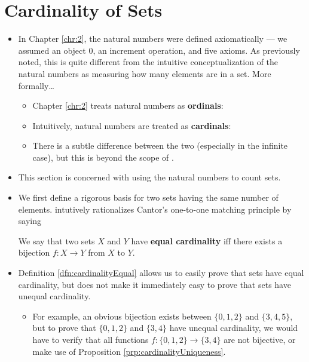 \documentclass[../main.tex]{subfiles}
\begin{document}
\section{Cardinality of Sets}
\begin{itemize}
    \item {}In Chapter \ref{chr:2}, the natural numbers were defined axiomatically --- we assumed an object 0, an increment operation, and five axioms. As previously noted, this is quite different from the intuitive conceptualization of the natural numbers as measuring how many elements are in a set. More formally\dots
    \begin{itemize}
        \item Chapter \ref{chr:2} treats natural numbers as \textbf{ordinals}: 
        \item Intuitively, natural numbers are treated as \textbf{cardinals}: 
        \item There is a subtle difference between the two (especially in the infinite case), but this is beyond the scope of \cite{bib:AnalysisI}.
    \end{itemize}
    \item This section is concerned with using the natural numbers to count sets.
    \item {}We first define a rigorous basis for two sets having the same number of elements. \cite{bib:AnalysisI} intutively rationalizes Cantor's one-to-one matching principle by saying 
    \begin{dfn}\label{dfn:cardinalityEqual}
        We say that two sets $X$ and $Y$ have \textbf{equal cardinality} iff there exists a bijection $f:X\to Y$ from $X$ to $Y$.
    \end{dfn}
    \item Definition \ref{dfn:cardinalityEqual} allows us to easily prove that sets have equal cardinality, but does not make it immediately easy to prove that sets have unequal cardinality.
    \begin{itemize}
        \item For example, an obvious bijection exists between $\{0,1,2\}$ and $\{3,4,5\}$, but to prove that $\{0,1,2\}$ and $\{3,4\}$ have unequal cardinality, we would have to verify that all functions $f:\{0,1,2\}\to\{3,4\}$ are not bijective, or make use of Proposition \ref{prp:cardinalityUniqueness}.

\end{itemize}
\end{itemize}
\end{document}
